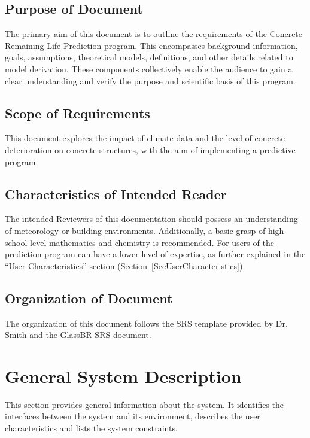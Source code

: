 \documentclass[12pt]{article}
\begin{document}
\subsection{Purpose of Document}

The primary aim of this document is to outline the requirements of the Concrete Remaining Life Prediction program. This encompasses background information, goals, assumptions, theoretical models, definitions, and other details related to model derivation. These components collectively enable the audience to gain a clear understanding and verify the purpose and scientific basis of this program.

\subsection{Scope of Requirements} 
This document explores the impact of climate data and the level of concrete deterioration on concrete structures, with the aim of implementing a predictive program.

\subsection{Characteristics of Intended Reader} \label{sec_IntendedReader}
The intended Reviewers of this documentation should possess an understanding of meteorology or building environments. Additionally, a basic grasp of high-school level mathematics and chemistry is recommended. For users of the prediction program can have a lower level of expertise, as further explained in the ``User Characteristics'' section (Section~\ref{SecUserCharacteristics}).

\subsection{Organization of Document}

The organization of this document follows the SRS template provided by Dr. Smith and the GlassBR SRS document.

\section{General System Description}

This section provides general information about the system.  It identifies the interfaces between the system and its environment, describes the user characteristics and lists the system constraints.  
\end{document}
